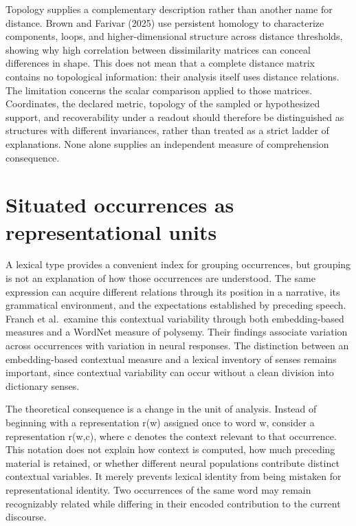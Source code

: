 \documentclass[11pt]{article}
\begin{document}
Topology supplies a complementary description rather than another name
for distance. Brown and Farivar (2025) use persistent homology to
characterize components, loops, and higher-dimensional structure across
distance thresholds, showing why high correlation between dissimilarity
matrices can conceal differences in shape. This does not mean that a
complete distance matrix contains no topological information: their
analysis itself uses distance relations. The limitation concerns the
scalar comparison applied to those matrices. Coordinates, the declared
metric, topology of the sampled or hypothesized support, and
recoverability under a readout should therefore be distinguished as
structures with different invariances, rather than treated as a strict
ladder of explanations. None alone supplies an independent measure of
comprehension consequence.

\hypertarget{situated-occurrences-as-representational-units}{%
\section{Situated occurrences as representational
units}\label{situated-occurrences-as-representational-units}}

A lexical type provides a convenient index for grouping occurrences, but
grouping is not an explanation of how those occurrences are understood.
The same expression can acquire different relations through its position
in a narrative, its grammatical environment, and the expectations
established by preceding speech. Franch et al.~examine this contextual
variability through both embedding-based measures and a WordNet measure
of polysemy. Their findings associate variation across occurrences with
variation in neural responses. The distinction between an
embedding-based contextual measure and a lexical inventory of senses
remains important, since contextual variability can occur without a
clean division into dictionary senses.

The theoretical consequence is a change in the unit of analysis. Instead
of beginning with a representation r(w) assigned once to word w,
consider a representation r(w,c), where c denotes the context relevant
to that occurrence. This notation does not explain how context is
computed, how much preceding material is retained, or whether different
neural populations contribute distinct contextual variables. It merely
prevents lexical identity from being mistaken for representational
identity. Two occurrences of the same word may remain recognizably
related while differing in their encoded contribution to the current
discourse.
\end{document}
